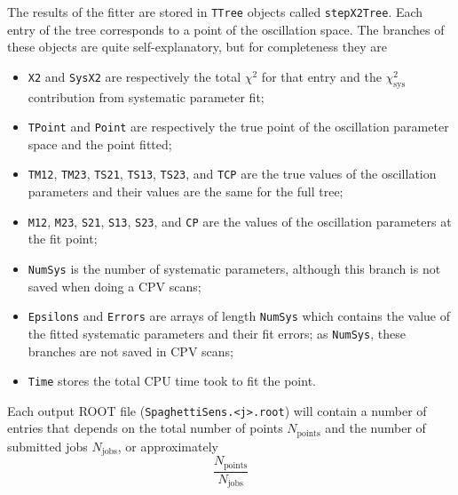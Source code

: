 \documentclass[a4paper, 11pt]{article}
\begin{document}
The results of the fitter are stored in \texttt{TTree} objects called \texttt{stepX2Tree}.
Each entry of the tree corresponds to a point of the oscillation space.
The branches of these objects are quite self-explanatory, but for completeness they are
\begin{itemize}
	\item \texttt{X2} and \texttt{SysX2} are respectively the total $\chi^2$ for that entry %
		and the $\chi^2_\text{sys}$ contribution from systematic parameter fit;
	\item \texttt{TPoint} and \texttt{Point} are respectively the true point of the oscillation %
		parameter space and the point fitted;
	\item \texttt{TM12}, \texttt{TM23}, \texttt{TS21}, \texttt{TS13}, \texttt{TS23}, and \texttt{TCP} %
		are the true values of the oscillation parameters and their values are the same %
		for the full tree; %
	\item \texttt{M12}, \texttt{M23}, \texttt{S21}, \texttt{S13}, \texttt{S23}, and \texttt{CP} %
		are the values of the oscillation parameters at the fit point;
	\item \texttt{NumSys} is the number of systematic parameters, although this branch is not %
		saved when doing a CPV scans;
	\item \texttt{Epsilons} and \texttt{Errors} are arrays of length \texttt{NumSys} %
		which contains the value of the fitted systematic parameters and their fit errors;
		as \texttt{NumSys}, these branches are not saved in CPV scans;
	\item \texttt{Time} stores the total CPU time took to fit the point.
\end{itemize}
Each output ROOT file (\texttt{SpaghettiSens.<j>.root}) will contain a number of entries %
that depends on the total number of points $N_\text{points}$ and the number of submitted %
jobs $N_\text{jobs}$, or approximately
\[
	\frac{N_\text{points}}{N_\text{jobs}}
\]
\end{document}
